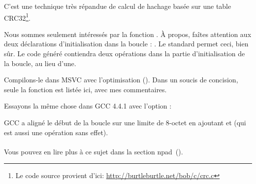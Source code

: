 \label{sec:CRC32}

\newcommand{\URLCRCSRC}{\url{http://burtleburtle.net/bob/c/crc.c}}

C'est une technique très répandue de calcul de hachage basée sur une table
CRC32\footnote{Le code source provient d'ici: \URLCRCSRC}.




Nous sommes seulement intéressés par la fonction .
À propos, faîtes attention aux deux déclarations d'initialisation dans la boucle
: .
Le standard \CCpp permet ceci, bien sûr.
Le code généré contiendra deux opérations dans la partie d'initialisation de la boucle,
au lieu d'une.

Compilons-le dans MSVC avec l'optimisation (\Ox).
Dans un soucis de concision, seule la fonction  est listée ici, avec mes
commentaires.



Essayons la même chose dans GCC 4.4.1 avec l'option \Othree:




GCC a aligné le début de la boucle sur une limite de 8-octet en ajoutant \NOP et
 (qui est aussi une opération sans effet).\\
\\
Vous pouvez en lire plus à ce sujet dans la section npad~().
